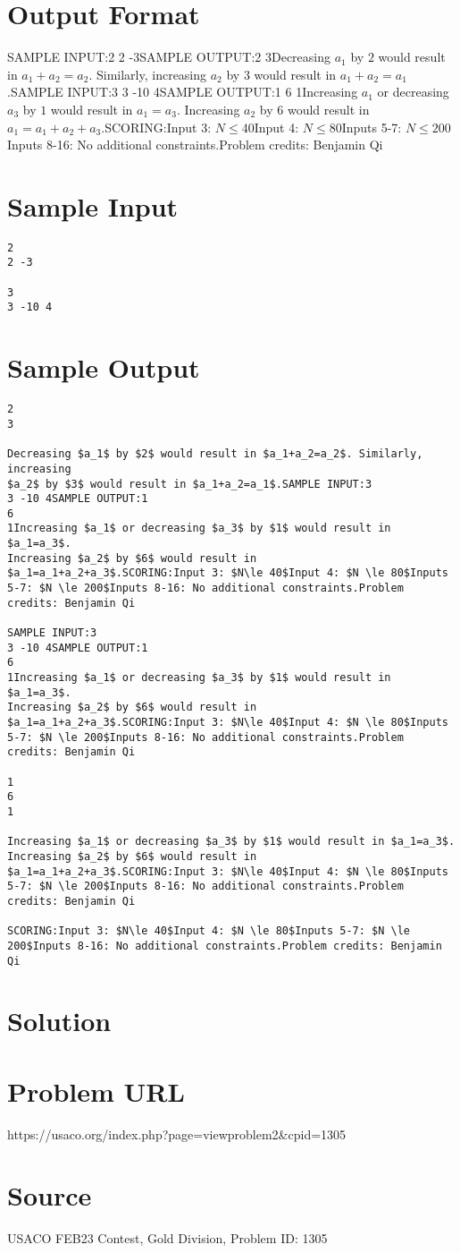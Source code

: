 \documentclass[12pt]{article}
\begin{document}
\section*{Output Format}
SAMPLE INPUT:2
2 -3SAMPLE OUTPUT:2
3Decreasing $a_1$ by $2$ would result in $a_1+a_2=a_2$. Similarly, increasing
$a_2$ by $3$ would result in $a_1+a_2=a_1$.SAMPLE INPUT:3
3 -10 4SAMPLE OUTPUT:1
6
1Increasing $a_1$ or decreasing $a_3$ by $1$ would result in $a_1=a_3$.
Increasing $a_2$ by $6$ would result in $a_1=a_1+a_2+a_3$.SCORING:Input 3: $N\le 40$Input 4: $N \le 80$Inputs 5-7: $N \le 200$Inputs 8-16: No additional constraints.Problem credits: Benjamin Qi

\section*{Sample Input}
\begin{verbatim}
2
2 -3

3
3 -10 4
\end{verbatim}

\section*{Sample Output}
\begin{verbatim}
2
3

Decreasing $a_1$ by $2$ would result in $a_1+a_2=a_2$. Similarly, increasing
$a_2$ by $3$ would result in $a_1+a_2=a_1$.SAMPLE INPUT:3
3 -10 4SAMPLE OUTPUT:1
6
1Increasing $a_1$ or decreasing $a_3$ by $1$ would result in $a_1=a_3$.
Increasing $a_2$ by $6$ would result in $a_1=a_1+a_2+a_3$.SCORING:Input 3: $N\le 40$Input 4: $N \le 80$Inputs 5-7: $N \le 200$Inputs 8-16: No additional constraints.Problem credits: Benjamin Qi

SAMPLE INPUT:3
3 -10 4SAMPLE OUTPUT:1
6
1Increasing $a_1$ or decreasing $a_3$ by $1$ would result in $a_1=a_3$.
Increasing $a_2$ by $6$ would result in $a_1=a_1+a_2+a_3$.SCORING:Input 3: $N\le 40$Input 4: $N \le 80$Inputs 5-7: $N \le 200$Inputs 8-16: No additional constraints.Problem credits: Benjamin Qi

1
6
1

Increasing $a_1$ or decreasing $a_3$ by $1$ would result in $a_1=a_3$.
Increasing $a_2$ by $6$ would result in $a_1=a_1+a_2+a_3$.SCORING:Input 3: $N\le 40$Input 4: $N \le 80$Inputs 5-7: $N \le 200$Inputs 8-16: No additional constraints.Problem credits: Benjamin Qi

SCORING:Input 3: $N\le 40$Input 4: $N \le 80$Inputs 5-7: $N \le 200$Inputs 8-16: No additional constraints.Problem credits: Benjamin Qi
\end{verbatim}

\section*{Solution}


\section*{Problem URL}
https://usaco.org/index.php?page=viewproblem2&cpid=1305

\section*{Source}
USACO FEB23 Contest, Gold Division, Problem ID: 1305
\end{document}
